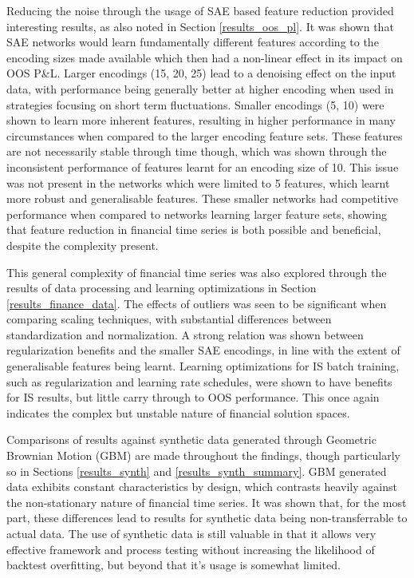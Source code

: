 \documentclass[a4paper,11pt,oneside]{article}
\theoremstyle{plain}
\theoremstyle{definition}
\begin{document}
	Reducing the noise through the usage of SAE based feature reduction provided interesting results, as also noted in Section \ref{results_oos_pl}. It was shown that SAE networks would learn fundamentally different features according to the encoding sizes made available which then had a non-linear effect in its impact on OOS P\&L. Larger encodings (15, 20, 25) lead to a denoising effect on the input data, with performance being generally better at higher encoding when used in strategies focusing on short term fluctuations. Smaller encodings (5, 10) were shown to learn more inherent features, resulting in higher performance in many circumstances when compared to the larger encoding feature sets. These features are not necessarily stable through time though, which was shown through the inconsistent performance of features learnt for an encoding size of 10. This issue was not present in the networks which were limited to 5 features, which learnt more robust and generalisable features. These smaller networks had competitive performance when compared to networks learning larger feature sets, showing that feature reduction in financial time series is both possible and beneficial, despite the complexity present. \newline	
	
	This general complexity of financial time series was also explored through the results of data processing and learning optimizations in Section \ref{results_finance_data}. The effects of outliers was seen to be significant when comparing scaling techniques, with substantial differences between standardization and normalization. A strong relation was shown between regularization benefits and the smaller SAE encodings, in line with the extent of generalisable features being learnt. Learning optimizations for IS batch training, such as regularization and learning rate schedules, were shown to have benefits for IS results, but little carry through to OOS performance. This once again indicates the complex but unstable nature of financial solution spaces.\newline	
	
	Comparisons of results against synthetic data generated through Geometric Brownian Motion (GBM) are made throughout the findings, though particularly so in Sections \ref{results_synth} and \ref{results_synth_summary}. GBM generated data exhibits constant characteristics by design, which contrasts heavily against the non-stationary nature of financial time series. It was shown that, for the most part, these differences lead to results for synthetic data being non-transferrable to actual data. The use of synthetic data is still valuable in that it allows very effective framework and process testing without increasing the likelihood of backtest overfitting, but beyond that it's usage is somewhat limited. \newline
	
\end{document}
